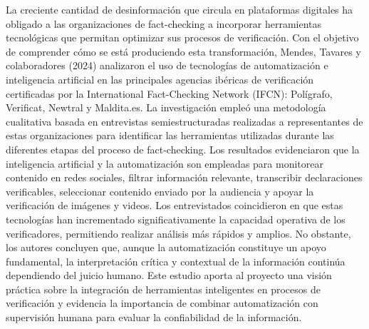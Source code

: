 \documentclass[12pt]{article}
\begin{document}
La creciente cantidad de desinformación que circula en plataformas digitales ha obligado a las organizaciones de fact-checking a incorporar herramientas tecnológicas que permitan optimizar sus procesos de verificación. Con el objetivo de comprender cómo se está produciendo esta transformación, Mendes, Tavares y colaboradores (2024) analizaron el uso de tecnologías de automatización e inteligencia artificial en las principales agencias ibéricas de verificación certificadas por la International Fact-Checking Network (IFCN): Polígrafo, Verificat, Newtral y Maldita.es. La investigación empleó una metodología cualitativa basada en entrevistas semiestructuradas realizadas a representantes de estas organizaciones para identificar las herramientas utilizadas durante las diferentes etapas del proceso de fact-checking. Los resultados evidenciaron que la inteligencia artificial y la automatización son empleadas para monitorear contenido en redes sociales, filtrar información relevante, transcribir declaraciones verificables, seleccionar contenido enviado por la audiencia y apoyar la verificación de imágenes y videos. Los entrevistados coincidieron en que estas tecnologías han incrementado significativamente la capacidad operativa de los verificadores, permitiendo realizar análisis más rápidos y amplios. No obstante, los autores concluyen que, aunque la automatización constituye un apoyo fundamental, la interpretación crítica y contextual de la información continúa dependiendo del juicio humano. Este estudio aporta al proyecto una visión práctica sobre la integración de herramientas inteligentes en procesos de verificación y evidencia la importancia de combinar automatización con supervisión humana para evaluar la confiabilidad de la información.
\end{document}
